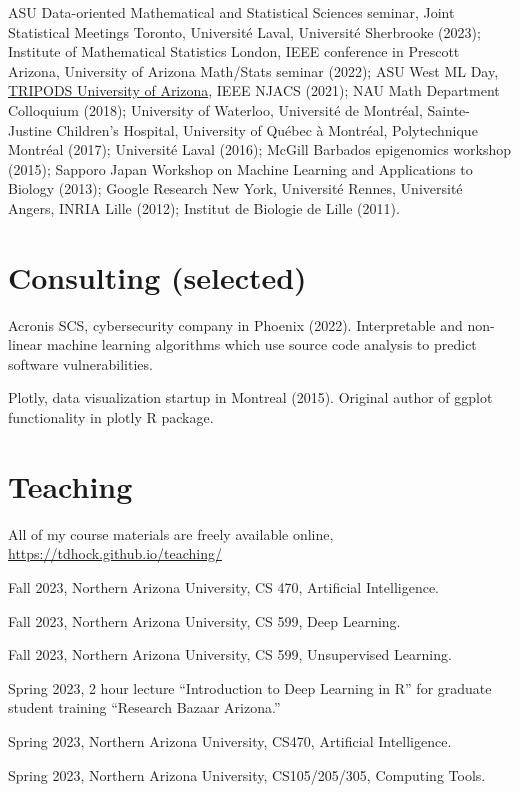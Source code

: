 \documentclass[margin,line]{res}
\begin{document}
\begin{resume}
ASU Data-oriented Mathematical and Statistical Sciences seminar, Joint
Statistical Meetings Toronto, Universit\'e Laval, Universit\'e
Sherbrooke (2023); Institute of Mathematical Statistics London, IEEE
conference in Prescott Arizona, University of Arizona Math/Stats
seminar (2022); ASU West ML Day,
\href{https://arizona.hosted.panopto.com/Panopto/Pages/Viewer.aspx?id=4e87c8d0-96d2-40d1-808c-ad16014c6962}{TRIPODS
  University of Arizona}, IEEE NJACS (2021); NAU Math Department
Colloquium (2018); University of Waterloo, Université de Montréal,
Sainte-Justine Children's Hospital, University of Québec à Montréal,
Polytechnique Montréal (2017); Universit\'e Laval (2016); McGill
Barbados epigenomics workshop (2015); Sapporo Japan Workshop on
Machine Learning and Applications to Biology (2013); Google Research
New York, Universit\'e Rennes, Universit\'e Angers, INRIA Lille
(2012); Institut de Biologie de Lille (2011).

\section{\sc Consulting (selected)}

Acronis SCS, cybersecurity company in Phoenix (2022). Interpretable
and non-linear machine learning algorithms which use source code
analysis to predict software vulnerabilities.

Plotly, data visualization startup in Montreal (2015). Original author
of ggplot functionality in plotly R package.

\section{\sc Teaching}

All of my course materials are freely available online,
\url{https://tdhock.github.io/teaching/}

Fall 2023, Northern Arizona University, CS 470, Artificial Intelligence.

Fall 2023, Northern Arizona University, CS 599, Deep Learning.

Fall 2023, Northern Arizona University, CS 599, Unsupervised Learning.

Spring 2023, 2 hour lecture ``Introduction to Deep Learning in R'' for
graduate student training ``Research Bazaar Arizona.''

Spring 2023, Northern Arizona University, CS470, Artificial Intelligence.

Spring 2023, Northern Arizona University, CS105/205/305, Computing Tools.


\end{resume}
\end{document}
